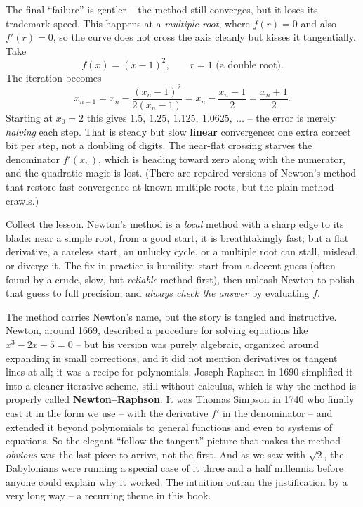 The final ``failure'' is gentler -- the method still converges, but it loses its
trademark speed. This happens at a \emph{multiple root}, where $f(r) = 0$ and also
$f'(r) = 0$, so the curve does not cross the axis cleanly but kisses it tangentially.
Take
\[
  f(x) = (x-1)^2, \qquad r = 1 \text{ (a double root)}.
\]
The iteration becomes
\[
  x_{n+1} = x_n - \frac{(x_n-1)^2}{2(x_n-1)} = x_n - \frac{x_n - 1}{2}
          = \frac{x_n + 1}{2}.
\]
Starting at $x_0 = 2$ this gives $1.5,\ 1.25,\ 1.125,\ 1.0625,\ \ldots$ -- the error
is merely \emph{halving} each step. That is steady but slow \textbf{linear}
convergence: one extra correct bit per step, not a doubling of digits. The
near-flat crossing starves the denominator $f'(x_n)$, which is heading toward zero
along with the numerator, and the quadratic magic is lost. (There are repaired
versions of Newton's method that restore fast convergence at known multiple roots,
but the plain method crawls.)

\begin{intuitionbox}
Collect the lesson. Newton's method is a \emph{local} method with a sharp edge to
its blade: near a simple root, from a good start, it is breathtakingly fast; but a
flat derivative, a careless start, an unlucky cycle, or a multiple root can stall,
mislead, or diverge it. The fix in practice is humility: start from a decent guess
(often found by a crude, slow, but \emph{reliable} method first), then unleash
Newton to polish that guess to full precision, and \emph{always check the answer}
by evaluating $f$.
\end{intuitionbox}

\begin{historybox}
The method carries Newton's name, but the story is tangled and instructive. Newton,
around 1669, described a procedure for solving equations like $x^3 - 2x - 5 = 0$ --
but his version was purely algebraic, organized around expanding in small
corrections, and it did not mention derivatives or tangent lines at all; it was a
recipe for polynomials. Joseph Raphson in 1690 simplified it into a cleaner
iterative scheme, still without calculus, which is why the method is properly called
\textbf{Newton--Raphson}. It was Thomas Simpson in 1740 who finally cast it in the
form we use -- with the derivative $f'$ in the denominator -- and extended it beyond
polynomials to general functions and even to systems of equations. So the elegant
``follow the tangent'' picture that makes the method \emph{obvious} was the last
piece to arrive, not the first. And as we saw with $\sqrt2$, the Babylonians were
running a special case of it three and a half millennia before anyone could explain
why it worked. The intuition outran the justification by a very long way -- a
recurring theme in this book.
\end{historybox}

